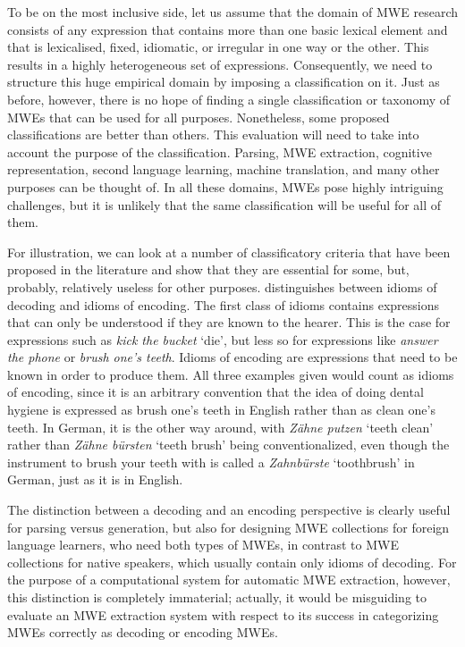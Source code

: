 \documentclass[output=paper]{langsci/langscibook}
\begin{document}
To be on the most inclusive side, let us assume that the domain of MWE research consists of any expression that contains more than one basic lexical element and that is lexicalised, fixed, idiomatic, or irregular in one way or the other. This results in a highly heterogeneous set of expressions. Consequently, we need to structure this huge empirical domain by imposing a classification on it. Just as before, however, there is no hope of finding a single classification or taxonomy of MWEs that can be used for all purposes. Nonetheless, some proposed classifications are better than others. This evaluation will need to take into account the purpose of the classification. Parsing, MWE extraction, cognitive representation, second language learning, machine translation, and many other purposes can be thought of. In all these domains, MWEs pose highly intriguing challenges, but it is unlikely that the same classification will be useful for all of them.

For illustration, we can look at a number of classificatory criteria that have been proposed in the literature and show that they are essential for some, but, probably, relatively useless for other purposes. \cite{Makai:72} distinguishes between idioms of decoding and idioms of encoding. The first class of idioms contains expressions that can only be understood if they are known to the hearer. This is the case for expressions such as \textit{kick the bucket} ‘die’, but less so for expressions like \textit{answer the phone} or \textit{brush one’s teeth}. Idioms of encoding are expressions that need to be known in order to produce them. All three examples given would count as idioms of encoding, since it is an arbitrary convention that the idea of doing dental hygiene is expressed as brush one’s teeth in English rather than as clean one’s teeth. In German, it is the other way around, with \textit{Z\"ahne putzen} `teeth clean’ rather than \textit{Z\"ahne b\"ursten} `teeth brush’ being conventionalized, even though the instrument to brush your teeth with is called a \textit{Zahnb\"urste} `toothbrush' in German, just as it is in English.

The distinction between a decoding and an encoding perspective is clearly useful for parsing versus generation, but also for designing MWE collections for foreign language learners, who need both types of MWEs, in contrast to MWE collections for native speakers, which usually contain only idioms of decoding. For the purpose of a computational system for automatic MWE extraction, however, this distinction is completely immaterial; actually, it would be misguiding to evaluate an MWE extraction system with respect to its success in categorizing MWEs correctly as decoding or encoding MWEs.
\end{document}
